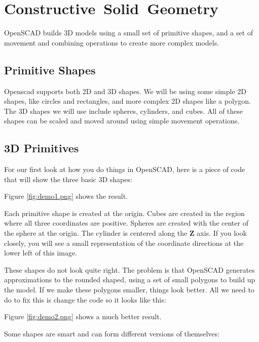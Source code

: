 \section*{\mbox{Constructive Solid Geometry}}

OpenSCAD builds 3D models using a small set of primitive shapes, and a set of
movement and combining operations to create more complex models.

\subsection*{Primitive Shapes}

Openscad supports both 2D and 3D shapes. We will be using some simple 2D
shapes, like circles and rectangles, and more complex 2D shapes like a polygon.
The 3D shapes we will use include spheres, cylinders, and cubes. All of these
shapes can be scaled and moved around using simple movement operations.

\subsection*{3D Primitives}
For our first look at how you do things in OpenSCAD, here is a piece of code
that will show the three basic 3D shapes:


Figure \ref{fig:demo1.png} shows the result.


Each primitive shape is created at the origin. Cubes are created in the region
where all three coordinates are positive. Spheres are created with the center
of the sphere at the origin. The cylinder is centered along the {\bf Z} axis.
If you look closely, you will see a small representation of the coordinate
directions at the lower left of this image.

These shapes do not look quite right. The problem is that OpenSCAD generates
approximations to the rounded shaped, using a set of small polygons to build up
the model. If we make these polygons smaller, things look better. All we need
to do to fix this is change the code so it looks like this:


Figure \ref{fig:demo2.png} shows a much better result.


Some shapes are smart and can form different versions of themselves:

